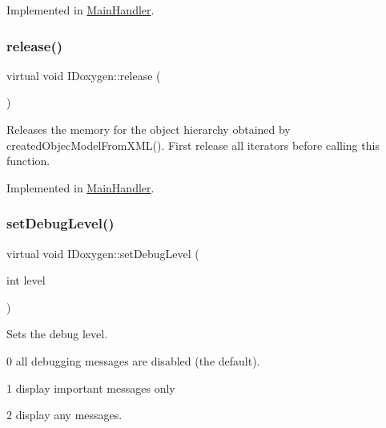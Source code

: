 Implemented in \mbox{\hyperlink{class_main_handler_a1f9507df93308fe3002cc2d97bd8c8be}{Main\+Handler}}.

\mbox{\label{class_i_doxygen_a6865961012ad8e6c19b7575488046045}} 
\subsubsection{\texorpdfstring{release()}{release()}\hspace{0.1cm}{\footnotesize\ttfamily [2/2]}}
{\footnotesize\ttfamily virtual void I\+Doxygen\+::release (\begin{DoxyParamCaption}{ }\end{DoxyParamCaption})\hspace{0.3cm}{\ttfamily [pure virtual]}}

Releases the memory for the object hierarchy obtained by created\+Objec\+Model\+From\+X\+M\+L(). First release all iterators before calling this function. 

Implemented in \mbox{\hyperlink{class_main_handler_a1f9507df93308fe3002cc2d97bd8c8be}{Main\+Handler}}.

\mbox{\label{class_i_doxygen_ae8e3759ffc6d64684dc500855f6fead6}} 
\subsubsection{\texorpdfstring{setDebugLevel()}{setDebugLevel()}\hspace{0.1cm}{\footnotesize\ttfamily [1/2]}}
{\footnotesize\ttfamily virtual void I\+Doxygen\+::set\+Debug\+Level (\begin{DoxyParamCaption}\item[{int}]{level }\end{DoxyParamCaption})\hspace{0.3cm}{\ttfamily [pure virtual]}}

Sets the debug level.
\begin{DoxyItemize}
\item 0 all debugging messages are disabled (the default).
\item 1 display important messages only
\item 2 display any messages. 
\end{DoxyItemize}

